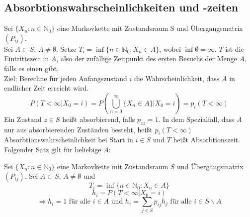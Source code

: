 \documentclass[a4paper,12pt]{article}
\begin{document}
\subsection{Absorbtionswahrscheinlichkeiten und -zeiten}
Sei $\{X_n: n \in \mathbb{N}_0\}$ eine Markovkette mit Zustandsraum S und Übergangsmatrix $(P_{ij})$.\\
Sei $A \subset S$, $A \neq \emptyset$. Setze $T_i = \inf \{n \in \mathbb{N}_0: X_n \in A\}$, wobei $\inf \emptyset = \infty$. $T$ ist die Eintrittszeit in $A$, also der zufällige Zeitpunkt des ersten Besuchs der Menge $A$, falls es einen gibt.\\
Ziel: Berechne für jeden Anfangszustand $i$ die Wahrscheinlichkeit, dass $A$ in endlicher Zeit erreicht wird.
$$
	P(T < \infty | X_0 = i) = P(\bigcup_{n = 0}^{\infty}\{X_n \in A\}| X_0 = i) = p_i(T < \infty)
$$
Ein Zustand $z \in S$ heißt absorbierend, falls $p_{zz} = 1$.
In dem Spezialfall, dass $A$ nur aus absorbierenden Zuständen besteht, heißt $p_i(T < \infty)$
Absorbtionswahrscheinlichkeit bei Start in $i \in S$ und $T$ heißt Absorbtionszeit.\\


Folgender Satz gilt für beliebige $A$:\\

\begin{tcolorbox}[breakable, colframe=green, colback=white, title=Satz 10]
	Sei $\{X_n: n \in \mathbb{N}_0\}$ eine Markovkette mit Zustandsraum $S$ und Übergangsmatrix $(P_{ij})$.
	Sei $A \subset S$, $A \neq \emptyset$ und
	$$
		T_i = \inf \{n \in \mathbb{N}_0: X_n \in A\}
	$$
	$$
		h_i = P(T < \infty | X_0 = i)
	$$
	$$
		\Rightarrow h_i = 1 \text{ für alle } i \in A \text{ und }
		h_i = \sum_{j \in S}p_{ij}h_j \text{ für alle } i \in S \backslash A
	$$
\end{tcolorbox}
\end{document}
